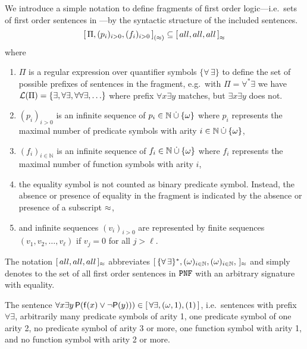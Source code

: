 \begin{definition}[\cite{MR1482227}]\label{def:prefix:class}
	We introduce a simple notation to define fragments 
	of first order logic---i.e.~sets of first order sentences in \PNF{}---by 
	the syntactic structure of the included sentences.
	\[
		{[ \, \Pi, (p_i)_{i>0}, (f_i)_{i>0} \, ]}_{(\approx)}
		\subseteq {[\, all, all, all\,]}_{\approx}
	\]
	where 
	\begin{enumerate}
		\item \( \Pi \) is a regular expression over quantifier symbols 
		\( \{ \forall\,\exists \} \) 
		to define the set of possible prefixes of sentences in the fragment, 
		e.g.~with \( \Pi = \forall^*\exists \) we have 
		\( \mathcal{L}(\Pi) = \{ \exists, \forall \exists, \forall\forall\exists, \ldots \} \)
		where prefix \( \forall x \exists y \) matches,
		but \( \exists x \exists y \) does not.
	\item \( (p_i)_{i>0} \) is an infinite sequence of 
	\( p_i \in \mathbb{N}\mathbin{\dot\cup}\{ \omega \} \) where 
	\( p_i \) represents the maximal number of predicate symbols 
	with arity \( i \in \mathbb{N}\mathbin{\dot\cup}\{ \omega \} \),
	\item \( (f_i)_{i\in\mathbb{N}} \) is an infinite sequence of 
	\( f_i \in \mathbb{N}\mathbin{\dot\cup}\{ \omega \} \) where
	\( f_i \) represents the maximal number of function symbols with arity \( i \),
	\item the equality symbol is not counted as binary predicate symbol. 
	Instead, the absence or presence of equality in the fragment
	is indicated by the absence or presence of a subscript \( \approx \),
% 
	\item and infinite sequences \( (v_i)_{i>0} \) are represented by
	finite sequences \( (v_1,v_2,\ldots,v_\ell) \) if
	\( v_j = 0 \) for all \( j > \ell \).
\end{enumerate}
\begin{remark}
	The notation \( [\,all,all,all\,]_{\approx} \) abbreviates
	\( [\,
		\{\forall\,\exists\}^{*}, 
		(\omega)_{i\in\mathbb{N}},
		(\omega)_{i\in\mathbb{N}},	  
	\,]_{\approx} \) 
	and simply denotes to the set of all first order sentences in \( \texttt{PNF} \)
	with an arbitrary signature with equality. 
\end{remark}
\end{definition}

\begin{example}
	The sentence 
	\( 
		\forall x \exists y \, \mathsf{P}(\mathsf{f}(x)\lor\lnot\mathsf{P}(y)))
		\in	[\, \forall\exists, (\omega, 1), (1) \,] 
	\),
	i.e.~sentences with prefix 
	\( \forall\exists \),
	arbitrarily many predicate symbols of arity 1, one predicate symbol of one arity 2, 
	no predicate symbol of arity 3 or more,
	one function symbol with arity 1,
	and no function symbol with arity 2 or more.
\end{example}

